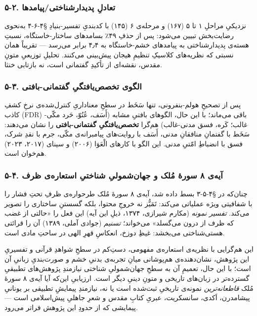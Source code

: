 \begin{RTL}
\begin{otherlanguage}{persian}
\subsubsection{۵-۲. تعادلِ
پدیدارشناختی/پیامدها}\label{ux62aux639ux627ux62fux644-ux67eux62fux6ccux62fux627ux631ux634ux646ux627ux62eux62aux6ccux67eux6ccux627ux645ux62fux647ux627}

نزدیکیِ مراحلِ ۱ تا ۵ (۱۶۷) و مرحله‌ی ۶ (۱۴۵) با کدبندیِ تفسیر-بنیادِ §۴-۶-۴
به‌نحوی رضایت‌بخش تبیین می‌شود: پس از حذفِ ۴۹٪ بسامدهای ساختار-خاستگاه، نسبتِ
هسته‌ی پدیدارشناختی به پیامدهای خشم-خاستگاه به ۴٫۴ برابر می‌رسد --- تقریباً
همان نسبتی که نظریه‌های کلاسیکِ تنظیمِ هیجان پیش‌بینی می‌کنند. تحلیلِ توزیعیِ
متونِ مقدس، نقشه‌ای از تأکیدِ گفتمانی است، نه بازتابی خنثا.

\subsubsection{۵-۳. الگوی تخصص‌یافتگیِ
گفتمانی-بافتی}\label{ux627ux644ux6afux648ux6cc-ux62aux62eux635ux635ux6ccux627ux641ux62aux6afux6cc-ux6afux641ux62aux645ux627ux646ux6cc-ux628ux627ux641ux62aux6cc}

پس از تصحیحِ هولم-بنفرونی، تنها سَخَط در سطحِ معناداریِ کنترل‌شده‌ی نرخِ کشفِ
کاذب (FDR) باقی می‌ماند؛ با این حال، الگوهای بافتیِ مشابه (أَسَف، عُتُوّ، حَرد
مکّی-غالب؛ کَره، فسق مدنی-غالب) هم‌گرا \textbf{تخصص‌یافتگیِ گفتمانی-بافتی} را
نشان می‌دهند: سَخَط با گفتمانِ منافقانِ مدنی، أَسَف با روایت‌های پیامبرانه‌ی مکّی،
جرم با نقدِ شرک، فسق با انضباطِ امّتیِ مدنی. این الگو با کارهای الْعَوَا (۲۰۰۶)
و سینای (۲۰۱۷، ۲۰۲۳) هم‌خوان است.

\subsubsection{۵-۴. آیه‌ی ۸ سورۀ مُلک و جهان‌شمولیِ شناختیِ استعاره‌ی
ظرف}\label{ux622ux6ccux647ux6cc-ux6f8-ux633ux648ux631ux6c0-ux645ux644ux6a9-ux648-ux62cux647ux627ux646ux634ux645ux648ux644ux6cc-ux634ux646ux627ux62eux62aux6cc-ux627ux633ux62aux639ux627ux631ux647ux6cc-ux638ux631ux641}

چنان‌که در §۴-۵-۳ بسط داده شد، آیه‌ی ۸ سورۀ مُلک طرحواره‌ی ظرفِ تحتِ فشار را
با شفافیتی ویژه عملیاتی می‌کند: تَمَیُّز نه خروجِ محتوا، بلکه گسستنِ ساختاری را
تصویر می‌کند. \emph{تفسیر نمونه} (مکارم شیرازی، ۱۳۷۴، ذیلِ این آیه) این
فعل را «حالتی از غضب که ظرف از درون می‌گسلد» می‌خواند؛ \emph{تسنیم} (جوادی
آملی، ۱۳۸۹) آن را قرائتی هستی‌شناختی می‌بخشد: غیظِ دوزخ، انعکاسِ قهرِ الهی در
ساحتِ مادی است.

این هم‌گرایی با نظریه‌ی استعاره‌ی مفهومی، دستِ‌کم در سطحِ شواهدِ قرآنی و تفسیریِ
این پژوهش، نشان‌دهنده‌ی هم‌پوشانی میانِ تجربه‌ی بدنیِ خشم و صورت‌بندیِ زبانیِ آن
است؛ با این حال، تعمیمِ آن به سطحِ جهان‌شمولیِ شناختی نیازمندِ پژوهش‌های
تطبیقیِ گسترده‌تر در زبان‌های تاریخی و متونِ دینیِ دیگر است. ارزیابیِ این‌که
آیا آیه‌ی ۸ سورۀ مُلک \emph{قاطعانه‌ترین} نمونه‌ی تاریخیِ ثبت‌شده است یا نه،
نیازمندِ پیمایشِ تطبیقی بر یونانیِ پیشامدرن، اَکدی، سانسکریت، عبریِ کتابِ مقدس
و شعرِ جاهلیِ پیش‌اسلامی است --- پیمایشی که از حدودِ این پژوهش فراتر می‌رود.


\end{otherlanguage}
\end{RTL}
